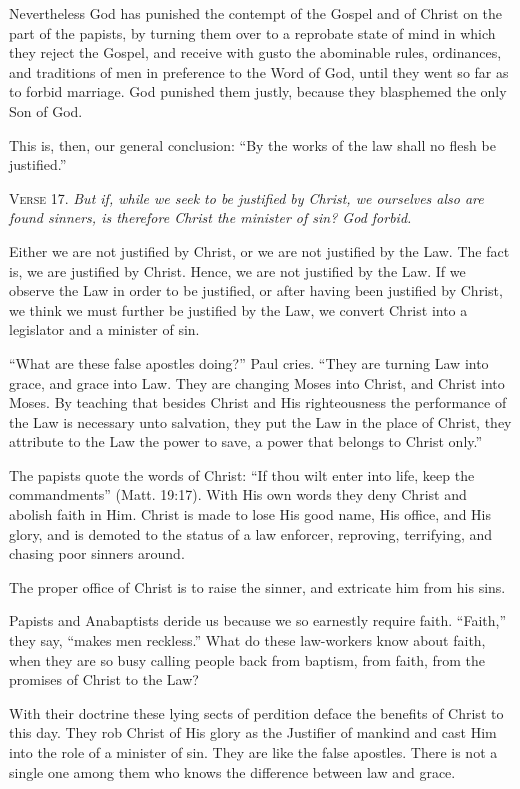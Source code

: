 Nevertheless God has punished the contempt of the Gospel and of Christ on the part of the papists, by turning them over to a reprobate state of mind in which they reject the Gospel, and receive with gusto the abominable rules, ordinances, and traditions of men in preference to the Word of God, until they went so far as to forbid marriage. God punished them justly, because they blasphemed the only Son of God.

This is, then, our general conclusion: “By the works of the law shall no flesh be justified.”

\textsc{Verse} 17. \emph{But if, while we seek to be justified by Christ, we ourselves also are found sinners, is therefore Christ the minister of sin? God forbid.}

Either we are not justified by Christ, or we are not justified by the Law. The fact is, we are justified by Christ. Hence, we are not justified by the Law. If we observe the Law in order to be justified, or after having been justified by Christ, we think we must further be justified by the Law, we convert Christ into a legislator and a minister of sin.

“What are these false apostles doing?” Paul cries. “They are turning Law into grace, and grace into Law. They are changing Moses into Christ, and Christ into Moses. By teaching that besides Christ and His righteousness the performance of the Law is necessary unto salvation, they put the Law in the place of Christ, they attribute to the Law the power to save, a power that belongs to Christ only.”

The papists quote the words of Christ: “If thou wilt enter into life, keep the commandments” (Matt. 19:17). With His own words they deny Christ and abolish faith in Him. Christ is made to lose His good name, His office, and His glory, and is demoted to the status of a law enforcer, reproving, terrifying, and chasing poor sinners around.

The proper office of Christ is to raise the sinner, and extricate him from his sins.

Papists and Anabaptists deride us because we so earnestly require faith. “Faith,” they say, “makes men reckless.” What do these law-workers know about faith, when they are so busy calling people back from baptism, from faith, from the promises of Christ to the Law?

With their doctrine these lying sects of perdition deface the benefits of Christ to this day. They rob Christ of His glory as the Justifier of mankind and cast Him into the role of a minister of sin. They are like the false apostles. There is not a single one among them who knows the difference between law and grace.


